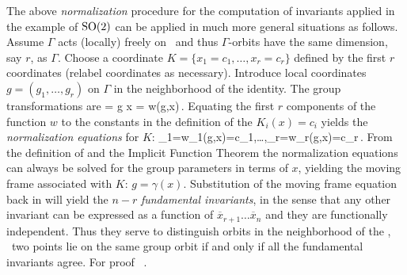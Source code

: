 The above \emph{normalization} procedure for the computation of
invariants applied in the example of $\mathrm{SO}(2)$ can be applied
in much more general situations as follows. Assume $\Gamma$
acts (locally) freely on \Manif\  and thus $\Gamma$-orbits
have the same dimension, say $r$, as $\Gamma$.  Choose a
coordinate {\csection} $K=\{x_1=c_1,\ldots,x_r=c_r\}$ defined
by the first $r$ coordinates (relabel coordinates as
necessary). Introduce local coordinates $g=(g_1,\ldots,g_r)$ on
$\Gamma$ in the neighborhood of the identity.
The group transformations are
\beq
	= g \cdot x = w(g,x)\,.
	\label{eq:transNorm}
\eeq
Equating the first $r$ components of the function $w$ to the constants in the definition
of the {\csection} $K_i(x)=c_i$ yields the \emph{normalization equations} for $K$:
\beq
	_1=w_1(g,x)=c_1,\ldots,_r=w_r(g,x)=c_r\,.
	\label{eq:normalization}
\eeq
From the definition of {\csection} and the Implicit Function Theorem the normalization equations
 can always be solved for the group parameters in terms of $x$,
yielding the moving frame associated with $K$: $g=\gamma(x)$. Substitution
of the moving frame equation back in  will yield the $n-r$
\emph{fundamental invariants}, in the sense that any other invariant can be expressed
as a function of $\overline{x}_{r+1}\ldots\overline{x}_n$ and they are functionally independent.
Thus they serve to distinguish orbits in the neighborhood of the {\csection}, \ie~two points lie on the same group
orbit if and only if all the fundamental invariants agree. For proof \cf~.

